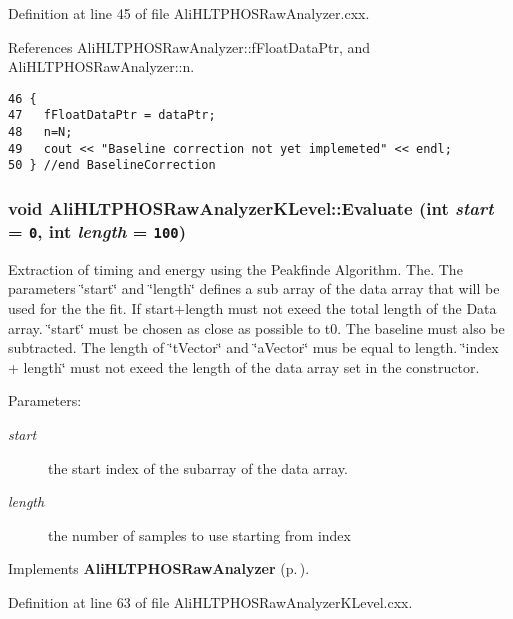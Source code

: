 Definition at line 45 of file Ali\-HLTPHOSRaw\-Analyzer.cxx.

References Ali\-HLTPHOSRaw\-Analyzer::f\-Float\-Data\-Ptr, and Ali\-HLTPHOSRaw\-Analyzer::n.

\footnotesize\begin{verbatim}46 {
47   fFloatDataPtr = dataPtr;  
48   n=N;
49   cout << "Baseline correction not yet implemeted" << endl;
50 } //end BaselineCorrection
\end{verbatim}\normalsize 


\subsubsection{\setlength{\rightskip}{0pt plus 5cm}void Ali\-HLTPHOSRaw\-Analyzer\-KLevel::Evaluate (int {\em start} = {\tt 0}, int {\em length} = {\tt 100})\hspace{0.3cm}{\tt  [virtual]}}\label{classAliHLTPHOSRawAnalyzerKLevel_AliHLTPHOSRawAnalyzerKLevela4}


Extraction of timing and energy using the Peakfinde Algorithm. The. The parameters \char`\"{}start\char`\"{} and \char`\"{}length\char`\"{} defines a sub array of the data array that will be used for the the fit. If start+length must not exeed the total length of the Data array. \char`\"{}start\char`\"{} must be chosen as close as possible to t0. The baseline must also be subtracted. The length of \char`\"{}t\-Vector\char`\"{} and \char`\"{}a\-Vector\char`\"{} mus be equal to length. \char`\"{}index + length\char`\"{} must not exeed the length of the data array set in the constructor. \begin{Desc}
\item[Parameters:]
\begin{description}
\item[{\em start}]the start index of the subarray of the data array. \item[{\em length}]the number of samples to use starting from index \end{description}
\end{Desc}


Implements {\bf Ali\-HLTPHOSRaw\-Analyzer} {\rm (p.\,\pageref{classAliHLTPHOSRawAnalyzer_AliHLTPHOSRawAnalyzera14})}.

Definition at line 63 of file Ali\-HLTPHOSRaw\-Analyzer\-KLevel.cxx.


